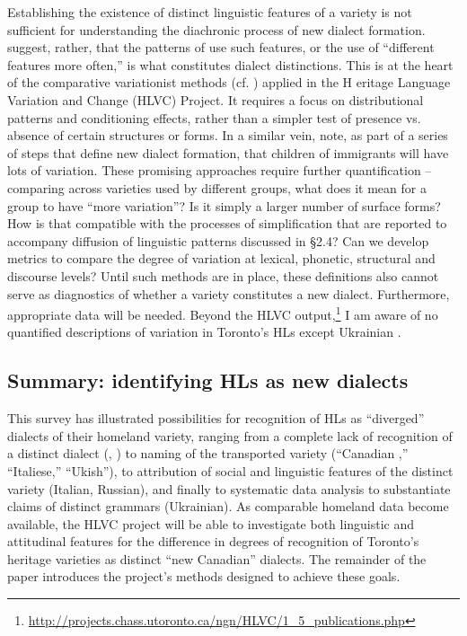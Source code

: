 \documentclass[output=paper]{LSP/langsci}
\begin{document}
Establishing the existence of distinct linguistic features of a variety is not sufficient for understanding the diachronic process of new dialect formation. \citet[6]{auer_study_2004} suggest, rather, that the patterns of use such features, or the use of “different features more often,” is what constitutes dialect distinctions. This is at the heart of the comparative variationist methods (cf. \citealt{cacoullos_testing_2010}) applied in the H
eritage Language Variation and Change (HLVC) Project. It requires a focus on distributional patterns and conditioning effects, rather than a simpler test of presence vs. absence of certain structures or forms. In a similar vein, \citet[215]{auer_birth_2004} note, as part of a series of steps that define new dialect formation, that children of immigrants will have lots of variation. These promising approaches require further quantification – comparing across varieties used by different groups, what does it mean for a group to have “more variation”? Is it simply a larger number of surface forms? How is that compatible with the processes of simplification that are reported to accompany diffusion of linguistic patterns discussed in §2.4? Can we develop metrics to compare the degree of variation at lexical, phonetic, structural and discourse levels? Until such methods are in place, these definitions also cannot serve as diagnostics of whether a variety constitutes a new dialect. Furthermore, appropriate data will be needed. Beyond the HLVC output,\footnote{\url{http://projects.chass.utoronto.ca/ngn/HLVC/1_5_publications.php}} I am aware of no quantified descriptions of variation in Toronto’s HLs except Ukrainian \citep{budzhak-jones_variable_1994,chumak-horbatsch_language_1987}. 

\subsection{Summary: identifying HLs as new dialects}

This survey has illustrated possibilities for recognition of HLs as “diverged” dialects of their homeland variety, ranging from a complete lack of recognition of a distinct dialect (, ) to naming of the transported variety (“Canadian ,” “Italiese,” “Ukish”), to attribution of social and linguistic features of the distinct variety (Italian, Russian), and finally to systematic data analysis to substantiate claims of distinct grammars (Ukrainian). As comparable homeland data become available, the HLVC project will be able to investigate both linguistic and attitudinal features for the difference in degrees of recognition of Toronto’s heritage varieties as distinct “new Canadian” dialects. The remainder of the paper introduces the project’s methods designed to achieve these goals.
\end{document}
